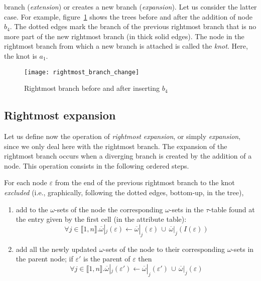 branch (\emph{extension}) or creates a new branch
(\emph{expansion}). Let us consider the latter case. For example,
figure~\ref{before_after_b4} shows the \XML trees before and after the
addition of node \(b_4\). The dotted edges mark the branch of the
previous rightmost branch that is no more part of the new rightmost
branch (in thick solid edges). The node in the rightmost branch from
which a new branch is attached is called the \emph{knot}. Here, the
knot is \(a_1\).
\begin{figure}[h]
\centering
\texttt{[image: rightmost\_branch\_change]}
\caption{Rightmost branch before and after inserting \(b_4\)}
\label{before_after_b4}
\end{figure}


\subsection{Rightmost expansion}

Let us define now the operation of \emph{rightmost expansion}, or
simply \emph{expansion}, since we only deal here with the rightmost
branch. The expansion of the rightmost branch occurs when a diverging
branch is created by the addition of a node. This operation consists
in the following ordered steps.

For each node \(\varepsilon\) from the end of the previous rightmost
branch to the knot \emph{excluded} (i.e., graphically, following the
dotted edges, bottom\hyp{}up, in the \XML tree),
\begin{enumerate}
   
  \item \label{border_expansion:1} add to the \(\omega\)-sets of the
  node the corresponding \(\omega\)-sets in the \(\tau\)-table found
  at the entry given by the first cell (in the attribute table):
  \[
    \forall j \in \llbracket 1, n
    \rrbracket.\overline{\omega}|_j(\varepsilon) \leftarrow
    \overline{\omega}|_j(\varepsilon) \, \cup \,
    \overline{\omega}|_j(I(\varepsilon))
  \] 

  \item \label{border_expansion:2} add all the newly updated
    \(\omega\)-sets of the node to their corresponding \(\omega\)-sets
    in the parent node; if \(\varepsilon'\) is the parent of
    \(\varepsilon\) then
  \[
    \forall j \in \llbracket 1, n
    \rrbracket.\overline{\omega}|_j(\varepsilon') \leftarrow
    \overline{\omega}|_j(\varepsilon') \, \cup \,
    \overline{\omega}|_j(\varepsilon)
  \]

\end{enumerate}

